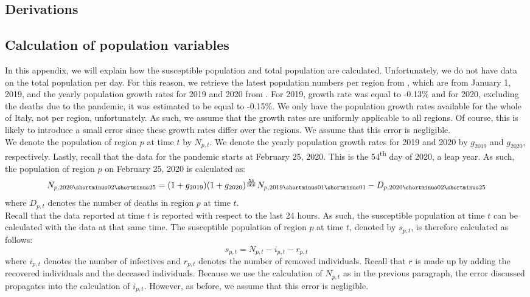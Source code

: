 \documentclass[12pt]{article}
\begin{document}
\begin{appendices}
		\newpage
		\section{Derivations} \label{app:derivations}
		
		\subsection{Calculation of population variables}\label{sapp:derivation_population_variables}
		In this appendix, we will explain how the susceptible population and total population are calculated. Unfortunately, we do not have data on the total population per day. For this reason, we retrieve the latest population numbers per region from \textcite{eurostatDatabase}, which are from January 1, 2019, and the yearly population growth rates for 2019 and 2020 from \textcite{worldometer2020italypopulation}. For 2019, growth rate was equal to -0.13\% and for 2020, excluding the deaths due to the pandemic, it was estimated to be equal to -0.15\%. We only have the population growth rates available for the whole of Italy, not per region, unfortunately. As such, we assume that the growth rates are uniformly applicable to all regions. Of course, this is likely to introduce a small error since these growth rates differ over the regions. We assume that this error is negligible. \\
		
		We denote the population of region $p$ at time $t$ by $N_{p,t}$. We denote the yearly population growth rates for 2019 and 2020 by $g_{2019}$ and $g_{2020}$, respectively. Lastly, recall that the data for the pandemic starts at February 25, 2020. This is the 54\textsuperscript{th} day of 2020, a leap year. As such, the population of region $p$ on February 25, 2020 is calculated as:
		\begin{equation}\label{eq:calc_total_population}
		    N_{p, 2020\shortminus02\shortminus25} = (1+g_{2019})(1+g_{2020})^{\frac{54}{366}}N_{p, 2019\shortminus01\shortminus01} - D_{p, 2020\shortminus02\shortminus25}
		\end{equation}
		where $D_{p,t}$ denotes the number of deaths in region $p$ at time $t$. \\
		
		Recall that the data reported at time $t$ is reported with respect to the last 24 hours. As such, the susceptible population at time $t$ can be calculated with the data at that same time. The susceptible population of region $p$ at time $t$, denoted by $s_{p,t}$, is therefore calculated as follows:
		\begin{equation}\label{eq:calc_susceptible_population}
		    s_{p,t} = N_{p,t} - i_{p,t} - r_{p,t}
		\end{equation}
		where $i_{p,t}$ denotes the number of infectives and $r_{p,t}$ denotes the number of removed individuals. Recall that $r$ is made up by adding the recovered individuals and the deceased individuals. Because we use the calculation of $N_{p,t}$ as in the previous paragraph, the error discussed propagates into the calculation of $i_{p,t}$. However, as before, we assume that this error is negligible.
		

\end{appendices}
\end{document}
